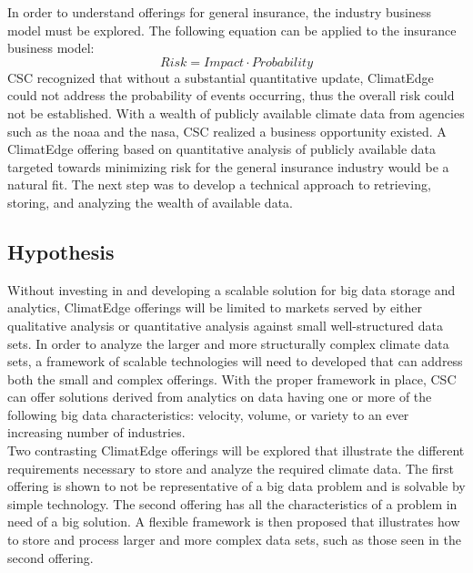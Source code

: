 In order to understand offerings for general insurance, the industry business model must be explored. The following equation can be applied to the insurance  business model: 
\begin{equation*}
    Risk = Impact \cdot Probability
\end{equation*}
\textsc{CSC} recognized that without a substantial quantitative update, ClimatEdge could not address the probability of events occurring, thus the overall risk could not be established. With a wealth of publicly available climate data from agencies such as the \gls{noaa} and the \gls{nasa}, \textsc{CSC} realized a business opportunity existed. A ClimatEdge offering based on quantitative analysis of publicly available data targeted towards minimizing risk for the general insurance industry would be a natural fit. The next step was to develop a technical approach to retrieving, storing, and analyzing the wealth of available data. 
\subsection{Hypothesis}
Without investing in and developing a scalable solution for big data  storage and analytics, ClimatEdge offerings will be limited to markets served by either qualitative analysis or quantitative analysis against small well-structured data sets. In order to analyze the larger and more structurally complex climate data sets, a framework of scalable technologies will need to developed that can address both the small and complex offerings. With the proper framework in place, \textsc{CSC} can offer solutions derived from analytics on data having one or more of the following big data characteristics: velocity, volume, or variety to an ever increasing number of industries.\\
 
Two contrasting ClimatEdge offerings will be explored that illustrate the different requirements necessary to store and analyze the required climate data. The first offering is shown to not be representative of a big data problem and is solvable by simple technology. The second offering has all the characteristics of a problem in need of a big solution. A flexible framework is then proposed that illustrates how to store and process larger and more complex data sets, such as those seen in the second offering.

